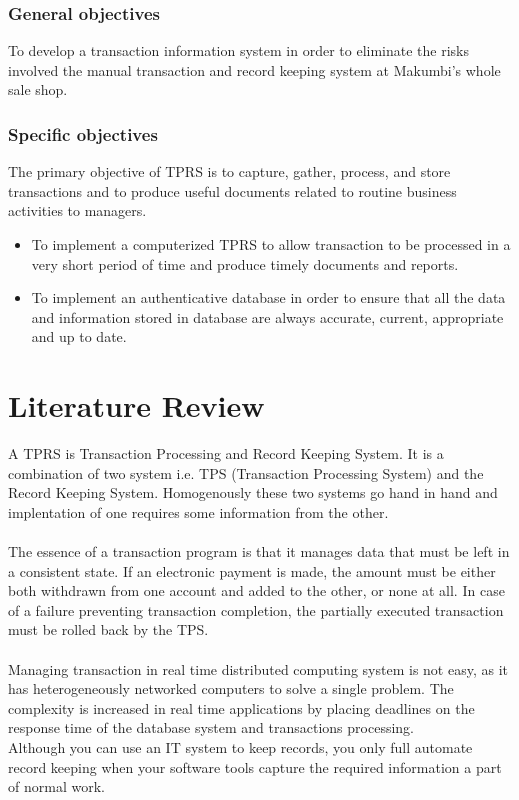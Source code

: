 \documentclass[12pt]{article}
\begin{document}
\subsubsection{General objectives}
To develop a transaction information system in order to eliminate the risks involved the manual transaction and record keeping system at Makumbi's whole sale shop.
\subsubsection{Specific objectives}
The primary objective of TPRS is to capture, gather, process, and store transactions and to produce useful documents related to routine business activities to managers.
\begin{itemize}
\item To implement a computerized TPRS to allow transaction to be processed in a very short period of time and produce timely documents and reports.
\item To implement an authenticative database in order to ensure that all the data and information stored in database are always accurate, current, appropriate and up to date.
\end{itemize}
\section{Literature Review} 
A TPRS is Transaction Processing and Record Keeping System. It is a combination of two system i.e. TPS (Transaction Processing System) and the Record Keeping System.
Homogenously these two systems go hand in hand and implentation of one requires some information from the other.\\\\
\cite{r2}The essence of a transaction program is that it manages data that must be left in a consistent state. If an electronic payment is made, the amount must be either both withdrawn from one account and added to the other, or none at all. In case of a failure preventing transaction completion, the partially executed transaction must be rolled back by the TPS. \\\\
\cite{r3}Managing transaction in real time distributed computing system is not easy, as it has heterogeneously networked computers to solve a single problem. The complexity is increased in real time applications by placing deadlines on the response time of the database system and transactions processing.\\
\cite{r4}Although you can use an IT system to keep records, you only full automate record keeping when your software tools capture the required information a part of normal work. 
\end{document}

